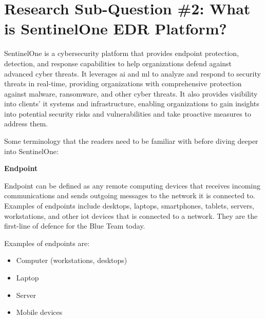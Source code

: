 \section{Research Sub-Question \#2: What is SentinelOne EDR Platform?}

SentinelOne is a cybersecurity platform that provides endpoint protection, detection, and response capabilities to
help organizations defend against advanced cyber threats. It leverages \acrshort{ai} and \acrshort{ml} to analyze
and respond to security threats in real-time, providing organizations with comprehensive protection against malware,
ransomware, and other cyber threats. It also provides visibility into clients' \acrshort{it} systems and infrastructure,
enabling organizations to gain insights into potential security risks and vulnerabilities and take proactive measures
to address them.

Some terminology that the readers need to be familiar with before diving deeper into SentinelOne:

\textbf{Endpoint}

Endpoint can be defined as any remote computing devices that receives incoming communications and sends outgoing messages
to the network it is connected to. Examples of endpoints include desktops, laptops, smartphones, tablets, servers, workstations,
and other \acrshort{iot} devices that is connected to a network. They are the first-line of defence for the Blue Team today.

Examples of endpoints are:
\begin{itemize}
      \item Computer (workstations, desktops)
      \item Laptop
      \item Server
      \item Mobile devices
\end{itemize}



